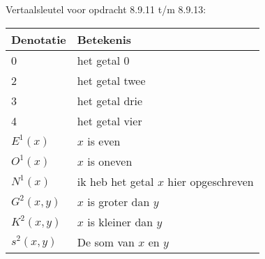 \begin{enumerate}

    Vertaalsleutel voor opdracht 8.9.11 t/m 8.9.13: \\
    \begin{tabular}{l|l}
      Denotatie & Betekenis\\
      \hline
      0 & het getal 0 \\
      2 & het getal twee \\
      3 & het getal drie \\
      4 & het getal vier \\
      $E^1(x)$ & $x$ is even \\
      $O^1(x)$ & $x$ is oneven \\
      $N^1(x)$ & ik heb het getal $x$ hier opgeschreven \\
      $G^2(x,y)$ & $x$ is groter dan $y$\\
      $K^2(x,y)$ & $x$ is kleiner dan $y$\\
      $s^2(x,y)$ & De som van $x$ en $y$\\
    \end{tabular}


\end{enumerate}
